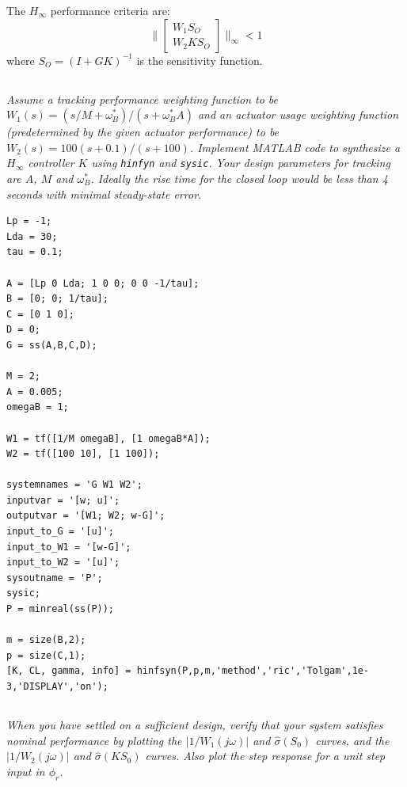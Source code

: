 \documentclass{article}
\begin{document}
The $H_\infty$ performance criteria are:
\[
\| \begin{bmatrix} W_1 S_O \\ W_2 K S_O \end{bmatrix} \|_\infty < 1
\]
where $S_O = (I + G K)^{-1}$ is the sensitivity function.

\subsection{}

\textit{Assume a tracking performance weighting function to be $W_1(s) = (s/M + \omega_B^*)/(s + \omega_B^* A)$ and an actuator usage weighting function (predetermined by the given actuator performance) to be $W_2(s) = 100(s + 0.1)/(s + 100)$. Implement MATLAB code to synthesize a $H_\infty$ controller $K$ using \texttt{hinfyn} and \texttt{sysic}. Your design parameters for tracking are $A$, $M$ and $\omega_B^*$. Ideally the rise time for the closed loop would be less than 4 seconds with minimal steady-state error.}

\begin{lstlisting}[style=matlabstyle]
Lp = -1;
Lda = 30;
tau = 0.1;

A = [Lp 0 Lda; 1 0 0; 0 0 -1/tau];
B = [0; 0; 1/tau];
C = [0 1 0];
D = 0;
G = ss(A,B,C,D);

M = 2;
A = 0.005;
omegaB = 1;

W1 = tf([1/M omegaB], [1 omegaB*A]);
W2 = tf([100 10], [1 100]);

systemnames = 'G W1 W2';
inputvar = '[w; u]';
outputvar = '[W1; W2; w-G]';
input_to_G = '[u]';
input_to_W1 = '[w-G]';
input_to_W2 = '[u]';
sysoutname = 'P';
sysic;
P = minreal(ss(P));

m = size(B,2);
p = size(C,1);
[K, CL, gamma, info] = hinfsyn(P,p,m,'method','ric','Tolgam',1e-3,'DISPLAY','on');     
\end{lstlisting}

\subsection{}

\textit{When you have settled on a sufficient design, verify that your system satisfies nominal performance by plotting the $|1/W_1(j\omega)|$ and $\hat{\sigma}(S_0)$ curves, and the $|1/W_2(j\omega)|$ and $\hat{\sigma}(KS_0)$ curves. Also plot the step response for a unit step input in $\phi_r$.}
\end{document}
